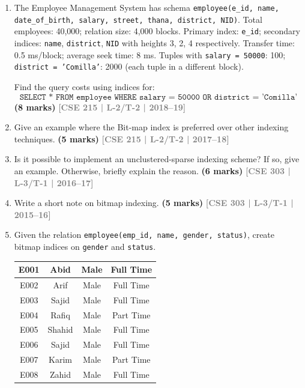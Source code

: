 \documentclass[12pt,a3paper]{article}
\newcommand{\yr}[1]{\hfill\textcolor{gray}{\small\textbf{[#1]}}}
\newcommand{\mk}[1]{\textcolor{orange!70!black}{\small\textbf{(#1 marks)}}}
\begin{document}
\begin{enumerate}
\item The Employee Management System has schema \texttt{employee(e\_id, name, date\_of\_birth, salary, street, thana, district, NID)}. Total employees: 40,000; relation size: 4,000 blocks. Primary index: \texttt{e\_id}; secondary indices: \texttt{name}, \texttt{district}, \texttt{NID} with heights 3, 2, 4 respectively. Transfer time: 0.5 ms/block; average seek time: 8 ms. Tuples with \texttt{salary = 50000}: 100; \texttt{district = 'Comilla'}: 2000 (each tuple in a different block).

Find the query costs using indices for:
\[\texttt{SELECT * FROM employee WHERE salary = 50000 OR district = 'Comilla'}\]
 \mk{8} \yr{CSE 215 | L-2/T-2 | 2018--19}

\item Give an example where the Bit-map index is preferred over other indexing techniques.
\mk{5} \yr{CSE 215 | L-2/T-2 | 2017--18}

\item Is it possible to implement an unclustered-sparse indexing scheme? If so, give an example. Otherwise, briefly explain the reason.
\mk{6} \yr{CSE 303 | L-3/T-1 | 2016--17}

\item Write a short note on bitmap indexing.
\mk{5} \yr{CSE 303 | L-3/T-1 | 2015--16}

\item Given the relation \texttt{employee(emp\_id, name, gender, status)}, create bitmap indices on \texttt{gender} and \texttt{status}.

\begin{center}
  \renewcommand{\arraystretch}{1.3} %
    \begin{tabular}{|c|c|c|c|}
        \hline
        E001 & Abid   & Male & Full Time \\ \hline
        E002 & Arif   & Male & Full Time \\ \hline
        E003 & Sajid  & Male & Full Time \\ \hline
        E004 & Rafiq  & Male & Part Time \\ \hline
        E005 & Shahid & Male & Full Time \\ \hline
        E006 & Sajid  & Male & Full Time \\ \hline
        E007 & Karim  & Male & Part Time \\ \hline
        E008 & Zahid  & Male & Full Time \\ \hline
    \end{tabular}
    

\end{center}
\end{enumerate}
\end{document}
